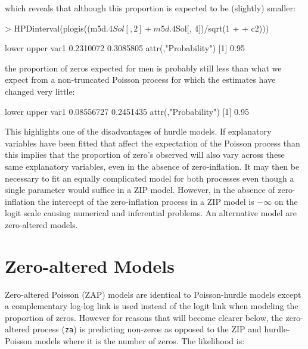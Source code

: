 \documentclass{article}
\begin{document}
which reveals that although this proportion is expected to be (slightly) smaller: 


\begin{Schunk}
\begin{Sinput}
> HPDinterval(plogis((m5d.4$Sol[, 2] + m5d.4$Sol[, 4])/sqrt(1 + 
+     c2)))
\end{Sinput}
\begin{Soutput}
         lower     upper
var1 0.2310072 0.3085805
attr(,"Probability")
[1] 0.95
\end{Soutput}
\end{Schunk}


the proportion of zeros expected for men is probably still less than what we expect from a non-truncated Poisson process for which the estimates have changed very little:

\begin{Schunk}
\begin{Soutput}
          lower     upper
var1 0.08556727 0.2451435
attr(,"Probability")
[1] 0.95
\end{Soutput}
\end{Schunk}


This highlights one of the disadvantages of hurdle models. If explanatory variables have been fitted that affect the expectation of the Poisson process than this implies that the proportion of zero's observed will also vary across these same explanatory variables, even in the absence of zero-inflation. It may then be necessary to fit an equally complicated model for both processes even though a single parameter would suffice in a ZIP model. However, in the absence of zero-inflation the intercept of the zero-inflation process in a ZIP model is $-\infty$ on the logit scale causing numerical and inferential problems. An alternative model are zero-altered models. 

\section{Zero-altered Models}
\label{ZAP}

Zero-altered Poisson (ZAP) models are identical to Poisson-hurdle models except a complementary log-log link is used instead of the logit link when modeling the proportion of zeros. However for reasons that will become clearer below, the zero-altered process (\texttt{za}) is predicting non-zeros as opposed to the ZIP and hurdle-Poisson models where it is the number of zeros.  The likelihood is:
\end{document}
